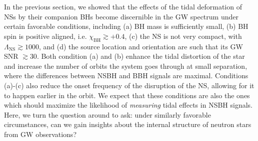 \documentclass[aps,prd,amsmath,floats,floatfix, twocolumn,
superscriptaddress,nofootinbib,showpacs]{revtex4-1}
\newcommand{\lambdans}{\Lambda_\mathrm{NS}}
\newcommand{\chibh}{\chi_\mathrm{BH}}
\begin{document}
%

In the previous section, we showed that the effects of the tidal deformation of
NSs by their companion BHs become discernible in
the GW spectrum under certain favorable conditions, including (a) BH mass is
sufficiently small, (b) BH spin is positive aligned, i.e. $\chibh\gtrsim +0.4$,
(c) the NS is not very compact, with $\lambdans\gtrsim 1000$, and (d) the
source location and orientation are such that its GW SNR $\gtrsim 30$.
% 
Both condition (a) and (b) enhance the tidal distortion of the star and increase
the number of orbits the system goes through at small separation, where the
differences between NSBH and BBH signals are maximal.
% 
Conditions (a)-(c) also reduce the onset frequency of the disruption of the NS,
allowing for it to happen earlier in the orbit. 
% 
We expect that these conditions are also the ones which should maximize the
likelihood of {\it measuring} tidal effects in NSBH signals. Here,
%
%
%
we turn the question around to ask: under similarly favorable circumstances,
can we gain insights about the internal structure of neutron stars from GW
observations?
\end{document}
